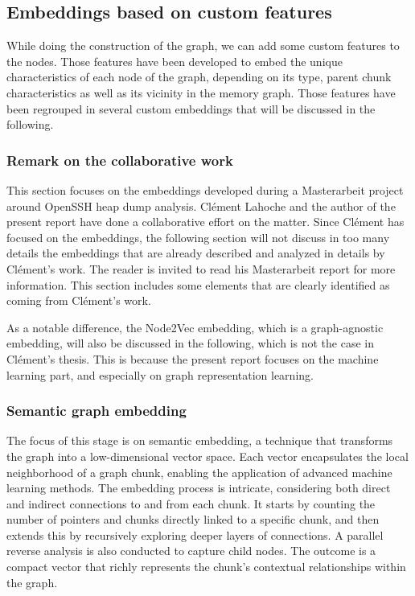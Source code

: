 \subsection{Embeddings based on custom features}
While doing the construction of the graph, we can add some custom features to the nodes. Those features have been developed to embed the unique characteristics of each node of the graph, depending on its type, parent chunk characteristics as well as its vicinity in the memory graph. Those features have been regrouped in several custom embeddings that will be discussed in the following.

\subsubsection{Remark on the collaborative work}
This section focuses on the embeddings developed during a Masterarbeit project around OpenSSH heap dump analysis. Clément Lahoche and the author of the present report have done a collaborative effort on the matter. Since Clément has focused on the embeddings, the following section will not discuss in too many details the embeddings that are already described and analyzed in details by Clément's work. The reader is invited to read his Masterarbeit report \cite{ClementEmbeddingsMasterarbeit23} for more information. This section includes some elements that are clearly identified as coming from Clément's work.

As a notable difference, the Node2Vec embedding, which is a graph-agnostic embedding, will also be discussed in the following, which is not the case in Clément's thesis. This is because the present report focuses on the machine learning part, and especially on graph representation learning.

\subsubsection{Semantic graph embedding}\label{sec:mem_2_graph:semantic_embedding}

The focus of this stage is on semantic embedding, a technique that transforms the graph into a low-dimensional vector space. Each vector encapsulates the local neighborhood of a graph chunk, enabling the application of advanced machine learning methods. The embedding process is intricate, considering both direct and indirect connections to and from each chunk. It starts by counting the number of pointers and chunks directly linked to a specific chunk, and then extends this by recursively exploring deeper layers of connections. A parallel reverse analysis is also conducted to capture child nodes. The outcome is a compact vector that richly represents the chunk's contextual relationships within the graph.

